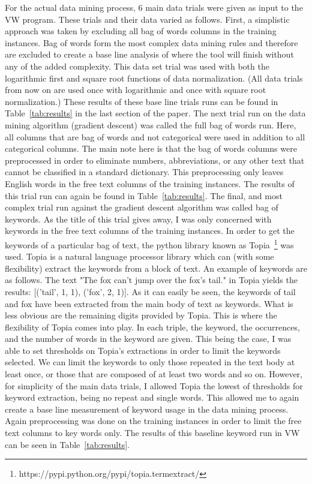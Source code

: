 \documentclass[conference]{IEEEtran}
\begin{document}
For the actual data mining process, 6 main data trials were given as input to
the VW program. These trials and their data varied as follows. First, a simplistic 
approach was taken by excluding all bag of words columns in the training
instances. Bag of words form the most complex data mining rules and therefore
are excluded to create a base line analysis of where the tool will finish without
any of the added complexity. This data set trial was used with both the logarithmic 
first and square root functions of data normalization. (All data trials
from now on are used once with logarithmic and once with square root normalization.) 
These results of these base line trials runs can be found in Table~\ref{tab:results}
in the last section of the paper. The next trial run on the data mining
algorithm (gradient descent) was called the full bag of words run. Here,
all columns that are bag of words and not categorical were used in addition to
all categorical columns. The main note here is that the bag of words columns
were preprocessed in order to eliminate numbers, abbreviations, or any other
text that cannot be classified in a standard dictionary. This preprocessing only
leaves English words in the free text columns of the training instances. The
results of this trial run can again be found in Table~\ref{tab:results}. The final, and most
complex trial run against the gradient descent algorithm was called
bag of keywords. As the title of this trial gives away, I was only concerned
with keywords in the free text columns of the training instances. In order to get
the keywords of a particular bag of text, the python library known as 
Topia~\footnote{https://pypi.python.org/pypi/topia.termextract/}
was used. Topia is a natural language processor library which can (with some
flexibility) extract the keywords from a block of text. An example of keywords
are as follows. The text "The fox can’t jump over the fox’s tail." in Topia yields
the results: [(’tail’, 1, 1), (’fox’, 2, 1)]. As it can easily be seen, the keywords
of tail and fox have been extracted from the main body of text as keywords.
What is less obvious are the remaining digits provided by Topia. This is
where the flexibility of Topia comes into play. In each triple, the keyword, the
occurrences, and the number of words in the keyword are given. This being the
case, I was able to set thresholds on Topia’s extractions in order to limit the
keywords selected. We can limit the keywords to only those repeated in the
text body at least once, or those that are composed of at least two words and
so on. However, for simplicity of the main data trials, I allowed Topia the
lowest of thresholds for keyword extraction, being no repeat and single words.
This allowed me to again create a base line measurement of keyword usage in the
data mining process. Again preprocessing was done on the training instances
in order to limit the free text columns to key words only. The results of this
baseline keyword run in VW can be seen in Table~\ref{tab:results}.
\end{document}
